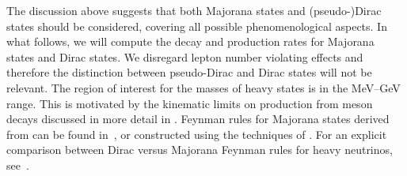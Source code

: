 

The discussion above suggests that both Majorana states and (pseudo-)Dirac states should be considered, %
covering all possible phenomenological aspects.
In what follows, we will compute the decay and production rates for Majorana states and Dirac states.
We disregard lepton number violating effects and therefore the distinction between pseudo-Dirac and Dirac states will not be relevant.
The region of interest for the masses of heavy states is in the MeV--GeV range.%
This is motivated by the kinematic limits on production from meson decays discussed in more detail in . %
Feynman rules for Majorana states derived from  can be found in~\cite{Atre:2009rg},
or constructed using the techniques of . 
For an explicit comparison between Dirac versus Majorana Feynman rules for heavy neutrinos, see~.

